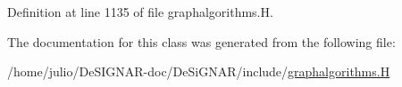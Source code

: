 Definition at line 1135 of file graphalgorithms.\+H.



The documentation for this class was generated from the following file\+:\begin{DoxyCompactItemize}
\item 
/home/julio/\+De\+S\+I\+G\+N\+A\+R-\/doc/\+De\+Si\+G\+N\+A\+R/include/\hyperlink{graphalgorithms_8_h}{graphalgorithms.\+H}\end{DoxyCompactItemize}
